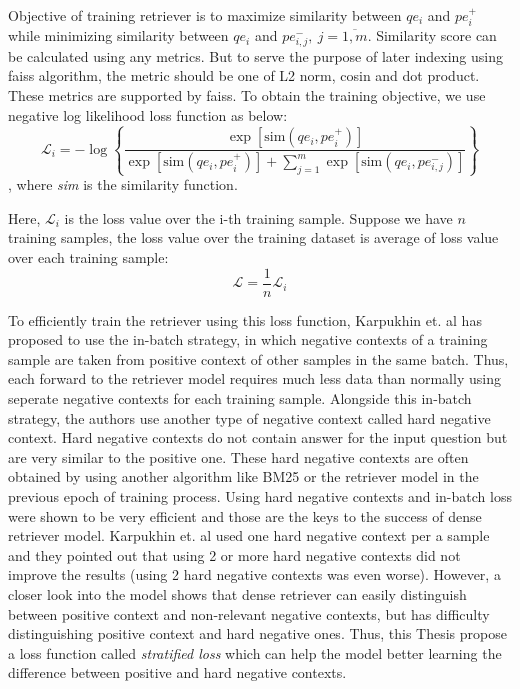\documentclass[12pt, sort&compress]{report}
\begin{document}
\par Objective of training retriever is to maximize similarity between $qe_i$ and $pe^+_i$ while minimizing similarity between $qe_i$ and $pe_{i,j}^-, \: j=\overline{1, m}$. Similarity score can be calculated using any metrics. But to serve the purpose of later indexing using faiss algorithm, the metric should be one of L2 norm, cosin and dot product. These metrics are supported by faiss. To obtain the training objective, we use negative log likelihood loss function as below:
\begin{equation}
	\label{eq:01}
	\mathcal{L}_i = -\log\left\{\dfrac{\exp\left[{\text{sim}\left(qe_i, pe_i^+\right)}\right]}{\exp\left[{\text{sim}\left(qe_i, pe_i^+\right)}\right] + \sum\limits_{j=1}^m\exp\left[\text{sim}\left(qe_i, pe_{i,j}^-\right)\right]}\right\}
\end{equation},
where \textit{sim} is the similarity function.
\par Here, $\mathcal{L}_i$ is the loss value over the i-th training sample. Suppose we have $n$ training samples, the loss value over the training dataset is average of loss value over each training sample:
\begin{equation}
	\mathcal{L} = \dfrac{1}{n}\mathcal{L}_i
\end{equation}
\par To efficiently train the retriever using this loss function, Karpukhin et. al \cite{karpukhin2020dense} has proposed to use the in-batch strategy, in which negative contexts of a training sample are taken from positive context of other samples in the same batch. Thus, each forward to the retriever model requires much less data than normally using seperate negative contexts for each training sample. Alongside this in-batch strategy, the authors use another type of negative context called hard negative context. Hard negative contexts do not contain answer for the input question but are very similar to the positive one. These hard negative contexts are often obtained by using another algorithm like BM25 or the retriever model in the previous epoch of training process. Using hard negative contexts and in-batch loss were shown to be very efficient and those are the keys to the success of dense retriever model. Karpukhin et. al used one hard negative context per a sample and they pointed out that using 2 or more hard negative contexts did not improve the results (using 2 hard negative contexts was even worse). However, a closer look into the model shows that dense retriever can easily distinguish between positive context and non-relevant negative contexts, but has difficulty distinguishing positive context and hard negative ones. Thus, this Thesis propose a loss function called \textit{stratified loss} which can help the model better learning the difference between positive and hard negative contexts.
\end{document}
